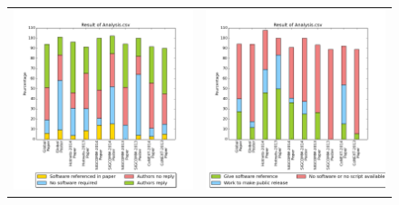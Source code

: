 \documentclass[a4paper]{SIGCOMM}
\begin{document}
\begin{figure}[!t]
    \centering
    \begin{tabular}{p{}p{}}
    \href{http://nhoutain.github.io/Reproducibility/}
        {\includegraphics[width=0.9\columnwidth]{stat/bar_mail/bar_mail-all.png}} &

    \href{http://nhoutain.github.io/Reproducibility/}
        {\includegraphics[width=0.9\columnwidth]{stat/bar_mail/bar_mail2-all.png}} \\


\end{tabular}
\end{figure}
\end{document}
